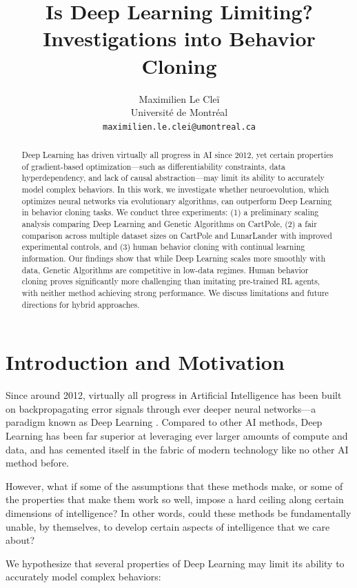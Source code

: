 \documentclass{article}
\title{Is Deep Learning Limiting? Investigations into Behavior Cloning}
\author{
  Maximilien Le Cle\"{i} \\
  Universit\'{e} de Montr\'{e}al \\
  \texttt{maximilien.le.clei@umontreal.ca}
}
\begin{document}
\maketitle

\begin{abstract}
Deep Learning has driven virtually all progress in AI since 2012, yet certain properties of gradient-based optimization---such as differentiability constraints, data hyperdependency, and lack of causal abstraction---may limit its ability to accurately model complex behaviors. In this work, we investigate whether neuroevolution, which optimizes neural networks via evolutionary algorithms, can outperform Deep Learning in behavior cloning tasks. We conduct three experiments: (1) a preliminary scaling analysis comparing Deep Learning and Genetic Algorithms on CartPole, (2) a fair comparison across multiple dataset sizes on CartPole and LunarLander with improved experimental controls, and (3) human behavior cloning with continual learning information. Our findings show that while Deep Learning scales more smoothly with data, Genetic Algorithms are competitive in low-data regimes. Human behavior cloning proves significantly more challenging than imitating pre-trained RL agents, with neither method achieving strong performance. We discuss limitations and future directions for hybrid approaches.
\end{abstract}

\section{Introduction and Motivation}

Since around 2012, virtually all progress in Artificial Intelligence has been built on backpropagating error signals through ever deeper neural networks---a paradigm known as Deep Learning \cite{lecun2015deep}. Compared to other AI methods, Deep Learning has been far superior at leveraging ever larger amounts of compute and data, and has cemented itself in the fabric of modern technology like no other AI method before.

However, what if some of the assumptions that these methods make, or some of the properties that make them work so well, impose a hard ceiling along certain dimensions of intelligence? In other words, could these methods be fundamentally unable, by themselves, to develop certain aspects of intelligence that we care about?

We hypothesize that several properties of Deep Learning may limit its ability to accurately model complex behaviors:
\end{document}
